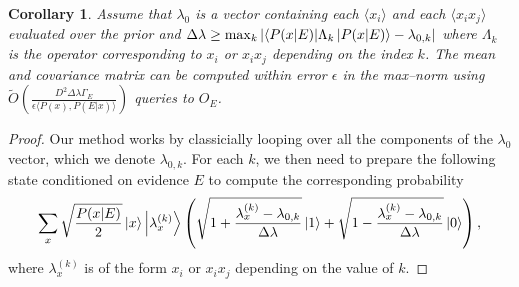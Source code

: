 \documentclass[aps,amsmath,onecolumn,amssymb,notitlepage]{revtex4-1}
\newtheorem{corollary}{Corollary}
\begin{document}
\begin{corollary}
Assume that $\lambda_0$ is a vector containing each $\langle x_i\rangle$ and each $\langle x_i x_j \rangle$ evaluated over the prior and $\Delta \lambda \ge \max_k |\langle P(x|E)| \Lambda_k \left|P(x|E)\right\rangle-\lambda_{0,k}|$ where $\Lambda_k$ is the operator corresponding to $x_i$ or $x_ix_j$  depending on the index $k$.  The mean and covariance matrix can be computed within error $\epsilon$ in the max--norm using $\tilde{O}\left(\frac{D^2\Delta \lambda \Gamma_E}{\epsilon \langle P(x), P(E|x)\rangle}\right)$ queries to $O_E$.\label{cor:method}
\end{corollary}
\begin{proof}
Our method works by classicially looping over all the components of the $\lambda_0$ vector, which we denote $\lambda_{0,k}$.
For each $k$, we then need to prepare the following state conditioned on evidence $E$ to compute the corresponding probability 
\begin{equation}
\sum_{x} \sqrt{\frac{P(x|E)}{2}} \left|x\right\rangle\left|\lambda_x^{(k)}\right\rangle\left(\sqrt{1+\frac{\lambda_x^{(k)}-\lambda_{0,k} }{\Delta \lambda}}\left|1\right\rangle + \sqrt{1-\frac{\lambda_x^{(k)}-\lambda_{0,k} }{\Delta \lambda}}\left|0\right\rangle \right),\label{eq:hadtest2}
\end{equation}
where $\lambda_x^{(k)}$ is of the form $x_i$ or $x_ix_j$ depending on the value of $k$.  


\end{proof}
\end{document}
